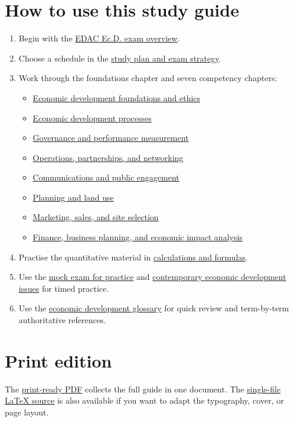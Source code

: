 \documentclass[11pt,letterpaper,oneside,openany]{book}
\newif\ifsectionhasicon
\newcommand{\currentsectionicon}{}
\newcommand{\marginsection}[2]{%
  \begingroup
  \sectionhasicontrue
  \def\currentsectionicon{#1}%
  \section[#2]{#2}%
  \endgroup
}
\begin{document}
\marginsection{route}{How to use this study guide}
\begin{enumerate}
\item Begin with the \hyperref[chap:exam-overview]{EDAC Ec.D. exam overview}.
\item Choose a schedule in the \hyperref[chap:study-plan]{study plan and exam strategy}.
\item Work through the foundations chapter and seven competency chapters:
\begin{itemize}
\item \hyperref[chap:foundations]{Economic development foundations and ethics}
\item \hyperref[chap:processes]{Economic development processes}
\item \hyperref[chap:governance]{Governance and performance measurement}
\item \hyperref[chap:operations]{Operations, partnerships, and networking}
\item \hyperref[chap:communications]{Communications and public engagement}
\item \hyperref[chap:planning]{Planning and land use}
\item \hyperref[chap:marketing]{Marketing, sales, and site selection}
\item \hyperref[chap:finance]{Finance, business planning, and economic impact analysis}
\end{itemize}

\item Practise the quantitative material in \hyperref[chap:calculations]{calculations and formulas}.
\item Use the \hyperref[chap:practice]{mock exam for practice} and \hyperref[chap:contemporary]{contemporary economic development issues} for timed practice.
\item Use the \hyperref[chap:glossary]{economic development glossary} for quick review and term-by-term authoritative references.
\end{enumerate}


\marginsection{file-text}{Print edition}
The \href{https://github.com/B1ackCat7/ecd-exam-study-guide/blob/main/output/pdf/ecd-exam-study-guide.pdf}{print-ready PDF} collects the full guide in one document. The \href{https://github.com/B1ackCat7/ecd-exam-study-guide/blob/main/print-edition/ecd-exam-study-guide.tex}{single-file LaTeX source} is also available if you want to adapt the typography, cover, or page layout.
\end{document}
